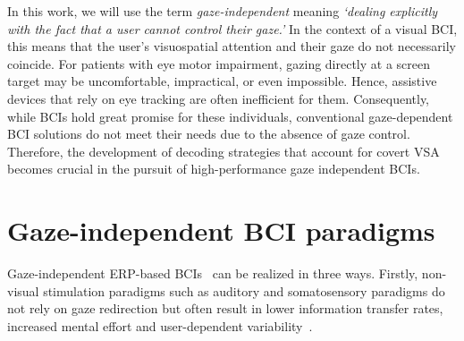 In this work, we will use the term \emph{gaze-independent} meaning
\emph{‘dealing explicitly with the fact that a user cannot control their
gaze.'}
In the context of a visual BCI, this means that the user's
visuospatial attention and their gaze do not necessarily coincide.
For patients with eye motor impairment, gazing directly at a screen target may
be uncomfortable, impractical, or even impossible.
Hence, assistive devices that rely on eye tracking are often inefficient for
them.
Consequently, while BCIs hold great promise for these individuals, conventional
gaze-dependent BCI solutions do not meet their needs due to the absence of gaze
control. Therefore, the development of decoding strategies that account for covert
VSA becomes crucial in the pursuit of high-performance gaze independent
BCIs.



\section{Gaze-independent BCI paradigms}
\label{sec:gaze-independence-paradigms}
Gaze-independent ERP-based BCIs~\cite{Riccio2012, Aloise2012} can be realized in three
ways. Firstly, non-visual stimulation paradigms such as auditory and somatosensory paradigms
do not rely on gaze redirection but often result in lower information transfer
rates, increased mental effort and user-dependent variability~\cite{Reichert2020b}.

